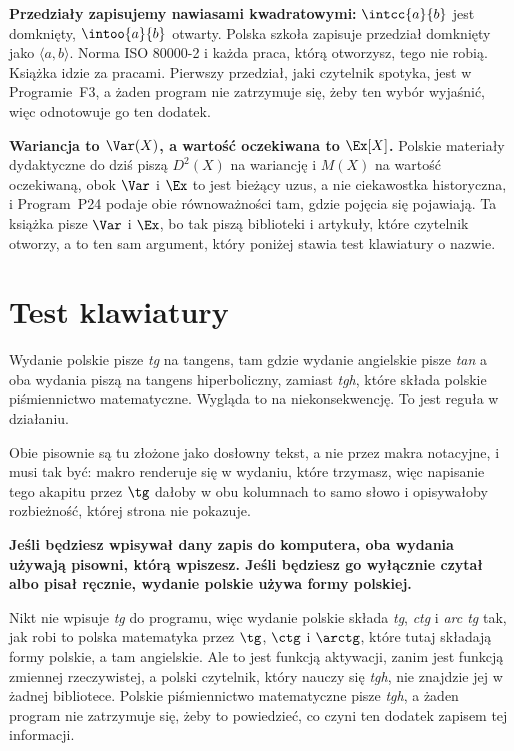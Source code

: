 \begin{notationbox}
\textbf{Przedziały zapisujemy nawiasami kwadratowymi:} $\intcc{a}{b}$ jest
domknięty, $\intoo{a}{b}$ otwarty. Polska szkoła zapisuje przedział domknięty
jako $\langle a, b\rangle$. Norma ISO 80000-2 i każda praca, którą otworzysz,
tego nie robią. Książka idzie za pracami. Pierwszy przedział, jaki czytelnik
spotyka, jest w Programie~F3, a żaden program nie zatrzymuje się, żeby ten
wybór wyjaśnić, więc odnotowuje go ten dodatek.
\end{notationbox}

\begin{notationbox}
\textbf{Wariancja to $\Var(X)$, a wartość oczekiwana to $\Ex[X]$.} Polskie
materiały dydaktyczne do dziś piszą $D^{2}(X)$ na wariancję i $M(X)$ na wartość
oczekiwaną, obok $\Var$ i $\Ex$ \dash{} to jest bieżący uzus, a nie ciekawostka
historyczna, i Program~P24 podaje obie równoważności tam, gdzie pojęcia się
pojawiają. Ta książka pisze $\Var$ i $\Ex$, bo tak piszą biblioteki i artykuły,
które czytelnik otworzy, a to ten sam argument, który poniżej stawia test
klawiatury o nazwie.
\end{notationbox}

\section{Test klawiatury}
\label{sec:appB-keyboard}

\noindent
Wydanie polskie pisze \emph{tg} na tangens, tam gdzie wydanie angielskie
pisze \emph{tan} \dash{} a oba wydania piszą  na tangens
hiperboliczny, zamiast \emph{tgh}, które składa polskie piśmiennictwo
matematyczne. Wygląda to na niekonsekwencję. To jest reguła w działaniu.

Obie pisownie są tu złożone jako dosłowny tekst, a nie przez makra notacyjne,
i musi tak być: makro renderuje się w wydaniu, które trzymasz, więc napisanie
tego akapitu przez $\tg$ dałoby w obu kolumnach to samo słowo i opisywałoby
rozbieżność, której strona nie pokazuje.

\begin{note}
\textbf{Jeśli będziesz wpisywał dany zapis do komputera, oba wydania używają
pisowni, którą wpiszesz. Jeśli będziesz go wyłącznie czytał albo pisał ręcznie,
wydanie polskie używa formy polskiej.}

Nikt nie wpisuje \emph{tg} do programu, więc wydanie polskie składa
\emph{tg}, \emph{ctg} i \emph{arc tg} tak, jak robi to polska matematyka
\dash{} przez $\tg$, $\ctg$ i $\arctg$, które tutaj składają formy polskie, a
tam angielskie. Ale  to
 \dash{} jest funkcją aktywacji, zanim jest funkcją zmiennej
rzeczywistej, a polski czytelnik, który nauczy się \emph{tgh}, nie znajdzie jej
w żadnej bibliotece. Polskie piśmiennictwo matematyczne pisze \emph{tgh}, a
żaden program nie zatrzymuje się, żeby to powiedzieć, co czyni ten dodatek
zapisem tej informacji.
\end{note}
